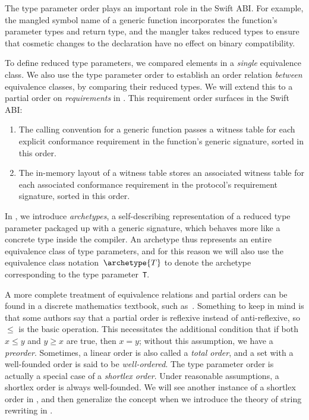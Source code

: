 \documentclass[../generics]{subfiles}
\begin{document}
The type parameter order plays an important role in the Swift ABI. For example, the mangled symbol name of a generic function incorporates the function's parameter types and return type, and the mangler takes reduced types to ensure that cosmetic changes to the declaration have no effect on binary compatibility.

To define reduced type parameters, we compared elements in a \emph{single} equivalence class. We also use the type parameter order to establish an order relation \emph{between} equivalence classes, by comparing their reduced types. We will extend this to a partial order on \emph{requirements} in . This requirement order surfaces in the Swift ABI:
\begin{enumerate}
\item The calling convention for a generic function passes a witness table for each explicit conformance requirement in the function's generic signature, sorted in this order.
\item The in-memory layout of a witness table stores an associated witness table for each associated conformance requirement in the protocol's requirement signature, sorted in this order.
\end{enumerate}

In , we introduce \emph{archetypes}, a self-describing representation of a reduced type parameter packaged up with a generic signature, which behaves more like a concrete type inside the compiler. An archetype thus represents an entire equivalence class of type parameters, and for this reason we will also use the equivalence class notation~$\archetype{T}$ to denote the archetype corresponding to the type parameter~\texttt{T}.

A more complete treatment of equivalence relations and partial orders can be found in a discrete mathematics textbook, such as~\cite{grimaldi}. Something to keep in mind is that some authors say that a partial order is reflexive instead of anti-reflexive, so $\leq$ is the basic operation. This necessitates the additional condition that if both $x\leq y$ and $y\geq x$ are true, then $x=y$; without this assumption, we have a \emph{preorder}. Sometimes, a linear order is also called a \emph{total order}, and a set with a well-founded order is said to be \emph{well-ordered}. The type parameter order is actually a special case of a \emph{shortlex order}. Under reasonable assumptions, a shortlex order is always well-founded. We will see another instance of a shortlex order in , and then generalize the concept when we introduce the theory of string rewriting in .
\end{document}
